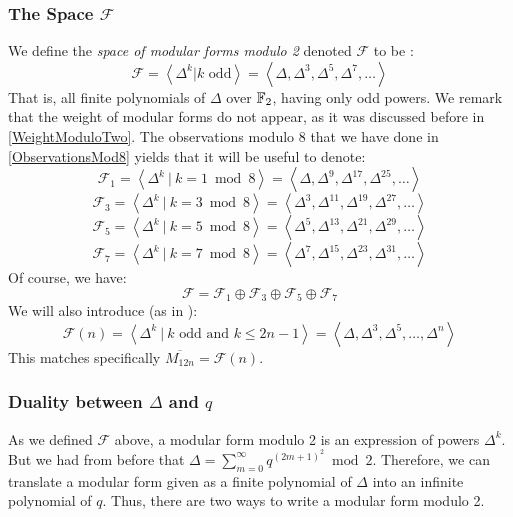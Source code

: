 \subsubsection{The Space $\mathcal{F}$}
\label{ModularFormsModTwo}
We define the \textit{space of modular forms modulo 2} denoted $\mathcal{F} $ to be \cite[2.1]{OrdreNilpotenceOperateurHecke}:
$$
\mathcal{F}
= \left\langle \Delta^k | k \text{ odd} \right\rangle
= \left\langle \Delta, \Delta^3, \Delta^5, \Delta^7, \dots \right\rangle 
$$
That is, all finite polynomials of $\Delta$ over $\mathbb{F}_2$, having only odd powers.
We remark that the weight of modular forms do not appear, as it was discussed before in \ref{WeightModuloTwo}.
The observations modulo 8 that we have done in \ref{ObservationsMod8} yields that it will be useful to denote:
$$
\mathcal{F}_1
= \left\langle \Delta^k \ | \ k = 1 \bmod 8 \right\rangle
= \left\langle \Delta, \Delta^9, \Delta^{17}, \Delta^{25}, \dots \right\rangle
$$
$$
\mathcal{F}_3
= \left\langle \Delta^k \ | \ k = 3 \bmod 8 \right\rangle
= \left\langle \Delta^3, \Delta^{11}, \Delta^{19}, \Delta^{27}, \dots \right\rangle
$$
$$
\mathcal{F}_5
= \left\langle \Delta^k \ | \ k = 5 \bmod 8 \right\rangle
= \left\langle \Delta^5, \Delta^{13}, \Delta^{21}, \Delta^{29}, \dots \right\rangle
$$
$$
\mathcal{F}_7
= \left\langle \Delta^k \ | \ k = 7 \bmod 8 \right\rangle
= \left\langle \Delta^7, \Delta^{15}, \Delta^{23}, \Delta^{31}, \dots \right\rangle
$$
Of course, we have:
$$
\mathcal{F} = \mathcal{F}_1 \oplus \mathcal{F}_3 \oplus \mathcal{F}_5 \oplus \mathcal{F}_7
$$
We will also introduce (as in \cite[2.]{StructureAlgebreHecke}):
$$
\mathcal{F}(n)
= \left\langle \Delta^k \ | \ k \text{ odd} \text{ and } k \leq 2n-1 \right\rangle
= \left\langle \Delta, \Delta^3, \Delta^5, \dots, \Delta^n \right\rangle
$$
This matches specifically $\overline{M_{12 n}} = \mathcal{F}(n)$.

\subsubsection{Duality between $\Delta$ and $q$}
As we defined $\mathcal{F}$ above, a modular form modulo 2 is an expression of powers $\Delta^k$.
But we had from before that $\Delta = \sum_{m=0}^{\infty} q^{(2m+1)^2} \bmod 2$.
Therefore, we can translate a modular form given as a finite polynomial of $\Delta$ into an infinite polynomial of $q$.
Thus, there are two ways to write a modular form modulo 2.

